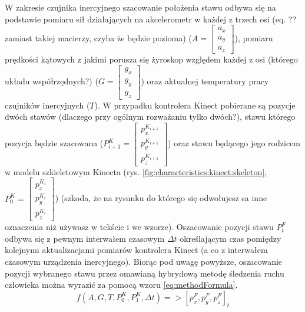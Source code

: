 W zakresie czujnika inercyjnego szacowanie położenia stawu odbywa się na podstawie pomiaru sił działających na akcelerometr w każdej z trzech osi 
(eq. ?? zamiast takiej macierzy, czyba że będzie pozioma) 
($A = \begin{bmatrix}a_x\\a_y\\a_z\end{bmatrix}$), pomiaru prędkości kątowych z jakimi porusza się żyroskop względem każdej z osi (którego układu współrzędnych?) ($G = \begin{bmatrix}g_x\\g_y\\g_z\end{bmatrix}$) oraz aktualnej temperatury pracy czujników inercyjnych ($T$). W przypadku kontrolera Kinect pobierane są pozycje dwóch stawów (dlaczego przy ogólnym rozważaniu tylko dwóch?), stawu którego pozycja będzie szacowana ($P^K_{i+1} = \begin{bmatrix}p^{K_{i+1}}_x\\p^{K_{i+1}}_y\\p^{K_{i+1}}_z\end{bmatrix}$) oraz stawu będącego jego rodzicem w modelu szkieletowym Kinecta (rys. \ref{fig:characteristics:kinect:skeleton}, $P^K_0 = \begin{bmatrix}p^{K_i}_x\\p^{K_i}_y\\p^{K_i}_z\end{bmatrix}$) (szkoda, że na rysunku do którego się odwołujesz sa inne oznaczenia niż używasz w tekście i we wzorze). Oszacowanie pozycji stawu $P^F_t$ odbywa się z pewnym interwałem czasowym $\Delta t$ określającym czas pomiędzy kolejnymi aktualizacjami pomiarów kontrolera Kinect (a co z interwałem czasowym urządzenia inercyjnego). Biorąc pod uwagę powyższe, oszacowanie pozycji wybranego stawu przez omawianą hybrydową metodę śledzenia ruchu człowieka można wyrazić za pomocą wzoru \eqref{eq:methodFormula}.
\begin{equation}
f(A,G,T,P_0^K,P_1^K,\Delta t) => [p_x^F,p_y^F,p_z^F]_t
\label{eq:methodFormula}
\end{equation}

